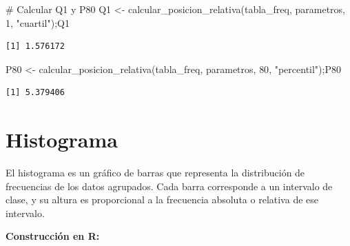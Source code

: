 \documentclass[
  spanish,
  letterpaper,
]{book}
\newenvironment{Shaded}{\begin{snugshade}}{\end{snugshade}}
\newcommand{\AttributeTok}[1]{\textcolor[rgb]{0.40,0.45,0.13}{#1}}
\newcommand{\CommentTok}[1]{\textcolor[rgb]{0.37,0.37,0.37}{#1}}
\newcommand{\DecValTok}[1]{\textcolor[rgb]{0.68,0.00,0.00}{#1}}
\newcommand{\FunctionTok}[1]{\textcolor[rgb]{0.28,0.35,0.67}{#1}}
\newcommand{\NormalTok}[1]{\textcolor[rgb]{0.00,0.23,0.31}{#1}}
\newcommand{\OtherTok}[1]{\textcolor[rgb]{0.00,0.23,0.31}{#1}}
\newcommand{\SpecialCharTok}[1]{\textcolor[rgb]{0.37,0.37,0.37}{#1}}
\newcommand{\StringTok}[1]{\textcolor[rgb]{0.13,0.47,0.30}{#1}}
\begin{document}
\begin{Shaded}
\begin{Highlighting}[]
\CommentTok{\# Calcular Q1 y P80}
\NormalTok{Q1 }\OtherTok{\textless{}{-}} \FunctionTok{calcular\_posicion\_relativa}\NormalTok{(tabla\_freq, parametros, }\DecValTok{1}\NormalTok{, }\StringTok{"cuartil"}\NormalTok{);Q1}
\end{Highlighting}
\end{Shaded}

\begin{verbatim}
[1] 1.576172
\end{verbatim}

\begin{Shaded}
\begin{Highlighting}[]
\NormalTok{P80 }\OtherTok{\textless{}{-}} \FunctionTok{calcular\_posicion\_relativa}\NormalTok{(tabla\_freq, parametros, }\DecValTok{80}\NormalTok{, }\StringTok{"percentil"}\NormalTok{);P80}
\end{Highlighting}
\end{Shaded}

\begin{verbatim}
[1] 5.379406
\end{verbatim}

\section{Histograma}\label{histograma-1}

El histograma es un gráfico de barras que representa la distribución de
frecuencias de los datos agrupados. Cada barra corresponde a un
intervalo de clase, y su altura es proporcional a la frecuencia absoluta
o relativa de ese intervalo.

\textbf{Construcción en R:}

\begin{Shaded}
\end{Shaded}
\end{document}
